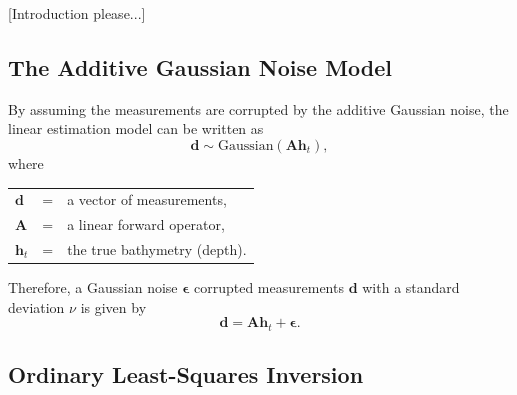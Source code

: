 [Introduction please...]

\subsection{The Additive Gaussian Noise Model} \label{Gaussian_noise}
By assuming the measurements are corrupted by the additive Gaussian noise, the linear estimation model can be written as 
\begin{equation}
\mathbf{d} \sim \text{Gaussian}( \mathbf{A} \mathbf{h}_t),
\end{equation}
\vspace{0.3cm}
where\\
\begin{tabular}{l c l}
$\mathbf{d}$ &=& a vector of measurements,\\
$\mathbf{A}$ &=& a linear forward operator,\\
$\mathbf{h}_t$ &=& the true bathymetry (depth). 
\end{tabular}

\vspace{0.3cm}
\noindent Therefore, a Gaussian noise $\boldsymbol{\epsilon}$ corrupted measurements $\mathbf{d}$ with a standard deviation  $\nu$ is given by 
$$
\mathbf{d} = \mathbf{A} \mathbf{h}_t + \boldsymbol{\epsilon}.
$$



\subsection{Ordinary Least-Squares Inversion}


